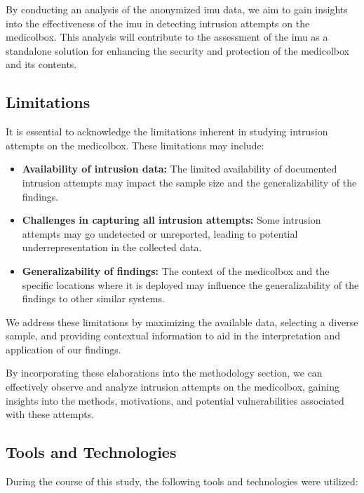 \documentclass[../main.tex]{subfiles}
\begin{document}
    By conducting an analysis of the anonymized \gls{imu} data,
    we aim to gain insights into the effectiveness of the
    \gls{imu} in detecting \gls{intrusion} attempts on the \gls{medicolbox}.
    This analysis will contribute to the assessment of the \gls{imu} as a
    standalone solution for enhancing the security and
    protection of the \gls{medicolbox} and its contents.

    \subsection{Limitations}        
    It is essential to acknowledge the limitations inherent in
    studying \gls{intrusion} attempts on the \gls{medicolbox}.
    These limitations may include:
        
    \begin{itemize}
        \item \textbf{Availability of \gls{intrusion} data:} The limited availability of documented \gls{intrusion} attempts may impact the sample size and the generalizability of the findings.

        \item \textbf{Challenges in capturing all \gls{intrusion} attempts:} Some \gls{intrusion} attempts may go undetected or unreported, leading to potential underrepresentation in the collected data.

        \item \textbf{Generalizability of findings:} The context of the \gls{medicolbox} and the specific locations where it is deployed may influence the generalizability of the findings to other similar systems.
    \end{itemize}
    
    We address these limitations by maximizing the available data,
    selecting a diverse sample, and providing contextual information to aid in the
    interpretation and application of our findings.
    
    By incorporating these elaborations into the methodology section,
    we can effectively observe and analyze \gls{intrusion} attempts on the
    \gls{medicolbox}, gaining insights into the methods,
    motivations, and potential vulnerabilities associated with these attempts.
    \subsection{Tools and Technologies}

During the course of this study, the following tools and technologies were utilized:
\end{document}
